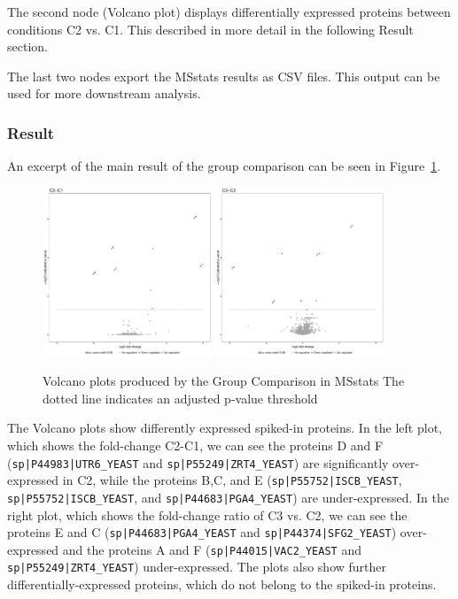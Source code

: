 The second node (Volcano plot) displays differentially expressed
proteins between conditions C2 vs. C1. This described in more detail in
the following Result section.

The last two nodes export the MSstats results as CSV files.
This output can be used for more downstream analysis.


\subsubsection{Result}
An excerpt of the main result of the group comparison can be seen in Figure~\ref{fig:msstats_1}.

\begin{figure}[htbp]
	\centering
	\includegraphics[width=0.45\textwidth]{graphics/labelfree/msstats/c2_c1.pdf}
	\qquad
	\includegraphics[width=0.45\textwidth]{graphics/labelfree/msstats/c3_c2.pdf}
	\caption{Volcano plots produced by the Group Comparison in MSstats
	The dotted line indicates an adjusted p-value threshold}
	\label{fig:msstats_1}
\end{figure}

The Volcano plots show differently expressed spiked-in proteins. In the left plot, which shows
the fold-change C2-C1, we
can see the proteins D and F (\texttt{sp|P44983|UTR6\_YEAST}
and \texttt{sp|P55249|ZRT4\_YEAST}) are significantly over-expressed in C2, while
 the proteins B,C, and E (\texttt{sp|P55752|ISCB\_YEAST}, \texttt{sp|P55752|ISCB\_YEAST},
 and \texttt{sp|P44683|PGA4\_YEAST}) are under-expressed.
 In the right plot, which shows the fold-change ratio of C3 vs. C2, we
 can see the proteins E and C (\texttt{sp|P44683|PGA4\_YEAST} and \texttt{sp|P44374|SFG2\_YEAST})
 over-expressed and the proteins A and F (\texttt{sp|P44015|VAC2\_YEAST} and
 \texttt{sp|P55249|ZRT4\_YEAST}) under-expressed. 
The plots also show further differentially-expressed proteins,
which do not belong to the spiked-in proteins.







